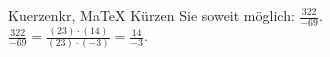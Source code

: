 \begin{MAufgabe}{Kuerzen}{kr, MaTeX}
K\"urzen Sie soweit m\"oglich: $\frac{322}{-69}$.\\ 
\ifLsg\MLoesung
\quad $\frac{322}{-69}=\frac{(23)\cdot(14)}{(23)\cdot(-3)}=\frac{14}{-3}$.\else\relax\fi
 \end{MAufgabe}